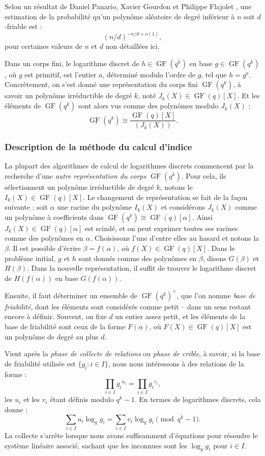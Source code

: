 \documentclass[a4paper, titlepage, 11pt]{article}
\theoremstyle{definition}
\theoremstyle{remark}
\def\o{o}
\def\gf{\operatorname{GF}}
\begin{document}
Selon un résultat de Daniel Panario, Xavier Gourdon et Philippe Flajolet \cite{PGF98}, une estimation de la probabilité qu'un polynôme aléatoire de degré inférieur à $n$ soit $d$-friable est :
$${(n/d)}^{-n/d + \o(1)},$$
pour certaines valeurs de $n$ et $d$ non détaillées ici.

Dans un corps fini, le logarithme discret de $h \in \gf(q^k)$ en base $g \in \gf(q^k)$, où $g$ est primitif, est l'entier $a$, déterminé modulo l'ordre de $g$, tel que $h = g^a$. Concrètement, on s'est donné une représentation du corps fini $\gf(q^k)$, à savoir un polynôme irréductible de degré $k$, noté $J_k(X) \in \gf(q)[X]$. Et les éléments de $\gf(q^k)$ sont alors vus comme des polynômes modulo $J_k(X)$ : 
$$\gf(q^k) \cong \frac{\gf(q)[X]}{(J_k(X))}.$$

\subsubsection{Description de la méthode du calcul d'indice}
La plupart des algorithmes de calcul de logarithmes discrets commencent par la recherche d'une \textit{autre représentation du corps $\gf(q^k)$}. Pour cela, ils sélectionnent un polynôme irréductible de degré $k$, notons le $I_k(X) \in \gf(q)[X]$. Le changement de représentation se fait de la façon suivante : soit $\alpha$ une racine du polynôme $I_k(X)$ et considérons $J_k(X)$ comme un polynôme à coefficients dans $\gf(q^k) \cong \gf(q)[\alpha]$. Ainsi $J_k(X) \in \gf(q)[\alpha]$ est scindé, et on peut exprimer toutes ses racines comme des polynômes en $\alpha$. Choisissons l'une d'entre elles au hasard et notons la $\beta$. Il est possible d'écrire $\beta = f(\alpha)$, où $f(X) \in \gf(q)[X]$. Dans le problème initial, $g$ et $h$ sont donnés comme des polynômes en $\beta$, disons $G(\beta)$ et $H(\beta)$. Dans la nouvelle représentation, il suffit de trouver le logarithme discret de $H(f(\alpha))$ en base $G(f(\alpha))$.

Ensuite, il faut déterminer un ensemble de $\gf(q^k)^\times$, que l'on nomme \textit{base de friabilité}, dont les éléments sont considérés comme petit -- dans un sens restant encore à définir. Souvent, on fixe $d$ un entier assez petit, et les éléments de la base de friabilité sont ceux de la forme $F(\alpha)$, où $F(X)\in\gf(q)[X]$ est un polynôme de degré au plus $d$.

Vient après la \textit{phase de collecte de relations} ou \textit{phase de crible}, à savoir, si la base de friabilité utilisée est $\{g_i : i \in I\}$, nous nous intéressons à des relations de la forme :
$$\prod_{i\in I} {g_i}^{u_i} = \prod_{i\in I} {g_i}^{v_i},$$
les $u_i$ et les $v_i$ étant définis modulo $q^k-1$. En termes de logarithmes discrets, cela donne :
$$\sum_{i\in I} u_i \log_gg_i = \sum_{i\in I} v_i \log_gg_i \pmod{q^k-1}.$$
La collecte s’arrête lorsque nous avons suffisamment d'équations pour résoudre le système linéaire associé, sachant que les inconnues sont les $\log_gg_i$ pour  $i\in I$.
\end{document}
